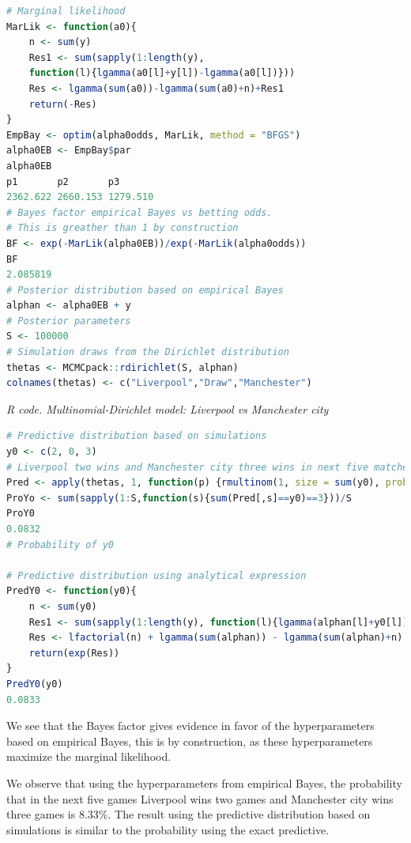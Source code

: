 \begin{enumerate}
\begin{tcolorbox}[enhanced,width=4.67in,center upper,
	fontupper=\large\bfseries,drop shadow southwest,sharp corners]
\begin{VF}
\begin{lstlisting}[language=R]
# Marginal likelihood
MarLik <- function(a0){
	n <- sum(y)
	Res1 <- sum(sapply(1:length(y), 
	function(l){lgamma(a0[l]+y[l])-lgamma(a0[l])}))
	Res <- lgamma(sum(a0))-lgamma(sum(a0)+n)+Res1
	return(-Res)
}
EmpBay <- optim(alpha0odds, MarLik, method = "BFGS")
alpha0EB <- EmpBay$par
alpha0EB
p1       p2       p3 
2362.622 2660.153 1279.510 
# Bayes factor empirical Bayes vs betting odds. 
# This is greather than 1 by construction
BF <- exp(-MarLik(alpha0EB))/exp(-MarLik(alpha0odds))
BF
2.085819
# Posterior distribution based on empirical Bayes
alphan <- alpha0EB + y 
# Posterior parameters 
S <- 100000
# Simulation draws from the Dirichlet distribution 
thetas <- MCMCpack::rdirichlet(S, alphan)
colnames(thetas) <- c("Liverpool","Draw","Manchester")
\end{lstlisting}
\end{VF}
\end{tcolorbox}


\begin{tcolorbox}[enhanced,width=4.67in,center upper,
	fontupper=\large\bfseries,drop shadow southwest,sharp corners]
	\textit{R code. Multinomial-Dirichlet model: Liverpool vs Manchester city}
\begin{VF}
\begin{lstlisting}[language=R]
# Predictive distribution based on simulations
y0 <- c(2, 0, 3) 
# Liverpool two wins and Manchester city three wins in next five matches
Pred <- apply(thetas, 1, function(p) {rmultinom(1, size = sum(y0), prob = p)})
ProYo <- sum(sapply(1:S,function(s){sum(Pred[,s]==y0)==3}))/S
ProY0
0.0832
# Probability of y0

# Predictive distribution using analytical expression
PredY0 <- function(y0){
	n <- sum(y0)
	Res1 <- sum(sapply(1:length(y), function(l){lgamma(alphan[l]+y0[l]) - lgamma(alphan[l])-lfactorial(y0[l])}))
	Res <- lfactorial(n) + lgamma(sum(alphan)) - lgamma(sum(alphan)+n) + Res1
	return(exp(Res))
}
PredY0(y0)         
0.0833
\end{lstlisting}
\end{VF}
\end{tcolorbox}

We see that the Bayes factor gives evidence in favor of the hyperparameters based on empirical Bayes, this is by construction, as these hyperparameters maximize the marginal likelihood.

We observe that using the hyperparameters from empirical Bayes, the probability that in the next five games Liverpool wins two games and Manchester city wins three games is 8.33\%. The result using the predictive distribution based on simulations is similar to the probability using the exact predictive.


\end{enumerate}
